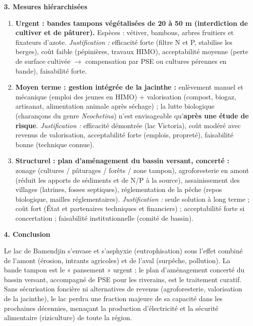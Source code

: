 \documentclass[11pt]{article}
\begin{document}
\begin{corrige}
\textbf{3. Mesures hiérarchisées}\par
\begin{enumerate}
    \item \textbf{Urgent : bandes tampons végétalisées de 20 à 50 m (interdiction de cultiver et de pâturer).} Espèces : vétiver, bambous, arbres fruitiers et fixateurs d'azote. \textit{Justification :} efficacité forte (filtre N et P, stabilise les berges), coût faible (pépinières, travaux HIMO), acceptabilité moyenne (perte de surface cultivée $\rightarrow$ compensation par PSE ou cultures pérennes en bande), faisabilité forte.
    \item \textbf{Moyen terme : gestion intégrée de la jacinthe :} enlèvement manuel et mécanique (emploi des jeunes en HIMO) + valorisation (compost, biogaz, artisanat, alimentation animale après séchage) ; la lutte biologique (charançons du genre \emph{Neochetina}) n'est envisageable qu'\textbf{après une étude de risque}. \textit{Justification :} efficacité démontrée (lac Victoria), coût modéré avec revenus de valorisation, acceptabilité forte (emplois, propreté), faisabilité bonne (technique connue).
    \item \textbf{Structurel : plan d'aménagement du bassin versant, concerté :} zonage (cultures / pâturages / forêts / zone tampon), agroforesterie en amont (réduit les apports de sédiments et de N/P à la source), assainissement des villages (latrines, fosses septiques), réglementation de la pêche (repos biologique, mailles réglementaires). \textit{Justification :} seule solution à long terme ; coût fort (État et partenaires techniques et financiers) ; acceptabilité forte si concertation ; faisabilité institutionnelle (comité de bassin).
\end{enumerate}

\textbf{4. Conclusion}\par
Le lac de Bamendjin s'envase et s'asphyxie (eutrophisation) sous l'effet combiné de l'amont (érosion, intrants agricoles) et de l'aval (surpêche, pollution). La bande tampon est le « pansement » urgent ; le plan d'aménagement concerté du bassin versant, accompagné de PSE pour les riverains, est le traitement curatif. Sans sécurisation foncière ni alternatives de revenus (agroforesterie, valorisation de la jacinthe), le lac perdra une fraction majeure de sa capacité dans les prochaines décennies, menaçant la production d'électricité et la sécurité alimentaire (riziculture) de toute la région.
\end{corrige}
\end{document}
